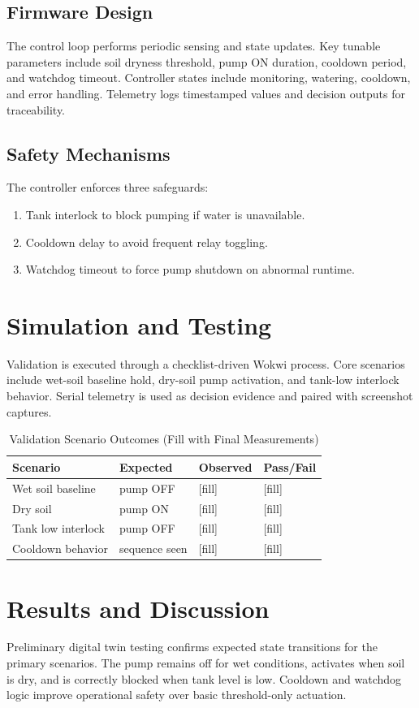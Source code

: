 \documentclass[conference]{IEEEtran}
\begin{document}
\subsection{Firmware Design}
The control loop performs periodic sensing and state updates. Key tunable parameters include soil dryness threshold, pump ON duration, cooldown period, and watchdog timeout. Controller states include monitoring, watering, cooldown, and error handling. Telemetry logs timestamped values and decision outputs for traceability.

\subsection{Safety Mechanisms}
The controller enforces three safeguards:
\begin{enumerate}
    \item Tank interlock to block pumping if water is unavailable.
    \item Cooldown delay to avoid frequent relay toggling.
    \item Watchdog timeout to force pump shutdown on abnormal runtime.
\end{enumerate}

\section{Simulation and Testing}
Validation is executed through a checklist-driven Wokwi process. Core scenarios include wet-soil baseline hold, dry-soil pump activation, and tank-low interlock behavior. Serial telemetry is used as decision evidence and paired with screenshot captures.

\begin{table}[!t]
\caption{Validation Scenario Outcomes (Fill with Final Measurements)}
\label{tab:validation}
\centering
\begin{tabular}{@{}llll@{}}
\toprule
Scenario & Expected & Observed & Pass/Fail \\
\midrule
Wet soil baseline & pump OFF & [fill] & [fill] \\
Dry soil & pump ON & [fill] & [fill] \\
Tank low interlock & pump OFF & [fill] & [fill] \\
Cooldown behavior & sequence seen & [fill] & [fill] \\
\bottomrule
\end{tabular}
\end{table}

\section{Results and Discussion}
Preliminary digital twin testing confirms expected state transitions for the primary scenarios. The pump remains off for wet conditions, activates when soil is dry, and is correctly blocked when tank level is low. Cooldown and watchdog logic improve operational safety over basic threshold-only actuation.
\end{document}
